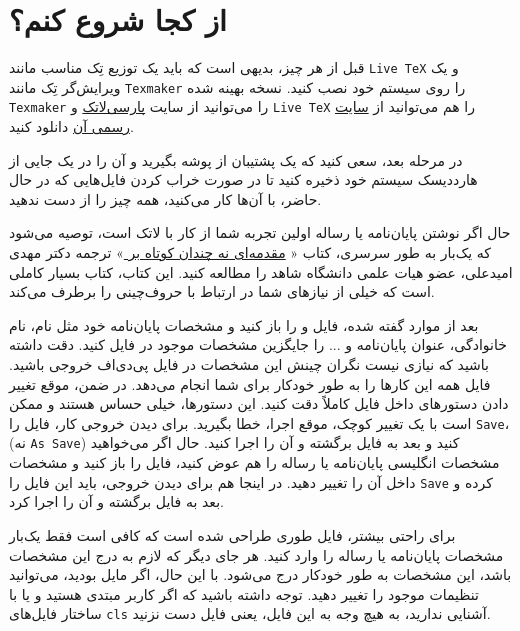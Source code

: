 \section{از کجا شروع کنم؟}
قبل از هر چیز، بدیهی است که باید یک توزیع تِک مناسب مانند 
\verb!Live TeX!
و یک ویرایش‌گر تِک مانند
\verb!Texmaker!
را روی سیستم خود نصب کنید.  نسخه بهینه شده \verb!Texmaker!  را می‌توانید  از سایت 
 \href{http://www.parsilatex.com}{پارسی‌لاتک}%
 و \verb!Live TeX!  را هم می‌توانید از 
 \href{http://www.tug.org/texlive}{سایت رسمی آن}%
 دانلود کنید.
 
در مرحله بعد، سعی کنید که  یک پشتیبان از پوشه 
 بگیرید و آن را در یک جایی از هارددیسک سیستم خود ذخیره کنید تا در صورت خراب کردن فایل‌هایی که در حال حاضر، با آن‌ها کار می‌کنید، همه چیز را از 
 دست ندهید.
 
 حال اگر نوشتن پایان‌نامه یا رساله اولین تجربه شما از کار با لاتک است، توصیه می‌شود که یک‌بار به طور سرسری، کتاب «%
\href{http://mirror.ctan.org/tex-archive/info/lshort/persian/lshort.pdf}{مقدمه‌ای نه چندان کوتاه بر
\lr{\LaTeXe}}»
   ترجمه دکتر مهدی امیدعلی، عضو هیات علمی دانشگاه شاهد را مطالعه کنید. این کتاب، کتاب بسیار کاملی است که خیلی از نیازهای شما در ارتباط با حروف‌چینی را برطرف می‌کند.
 
 
بعد از موارد گفته شده، فایل 
و
را باز کنید و مشخصات پایان‌نامه خود مثل نام، نام خانوادگی، عنوان پایان‌نامه و ... را جایگزین مشخصات موجود در فایل
 کنید. دقت داشته باشید که نیازی نیست 
نگران چینش این مشخصات در فایل پی‌دی‌اف خروجی باشید. فایل 
همه این کارها را به طور خودکار برای شما انجام می‌دهد. در ضمن، موقع تغییر دادن دستورهای داخل فایل
 کاملاً  دقت کنید. این دستورها، خیلی حساس هستند و ممکن است با یک تغییر کوچک، موقع اجرا، خطا بگیرید. برای دیدن خروجی کار، فایل 
 را 
\verb!Save!، 
(نه 
\verb!As Save!)
کنید و بعد به فایل 
برگشته و آن را اجرا کنید. حال اگر می‌خواهید مشخصات انگلیسی پایان‌نامه یا رساله را هم عوض کنید، فایل 
را باز کنید و مشخصات داخل آن را تغییر دهید.
در اینجا هم برای دیدن خروجی، باید این فایل را 
\verb!Save!
کرده و بعد به فایل 
برگشته و آن را اجرا کرد.

برای راحتی بیشتر، 
فایل 
طوری طراحی شده است که کافی است فقط  یک‌بار مشخصات پایان‌نامه یا رساله  را وارد کنید. هر جای دیگر که لازم به درج این مشخصات باشد، این مشخصات به طور خودکار درج می‌شود. با این حال، اگر مایل بودید، می‌توانید تنظیمات موجود را تغییر دهید. توجه داشته باشید که اگر کاربر مبتدی هستید و یا با ساختار فایل‌های  
\verb!cls!
 آشنایی ندارید، به هیچ وجه به این فایل، یعنی فایل 
دست نزنید.

